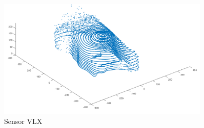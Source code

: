 \begin{figure}[H]
	\centering
	\includegraphics[width=0.9\textwidth]{images/Validierung/VLX.png}
	\caption{Sensor VLX}
	\label{vlxa}
\end{figure}



